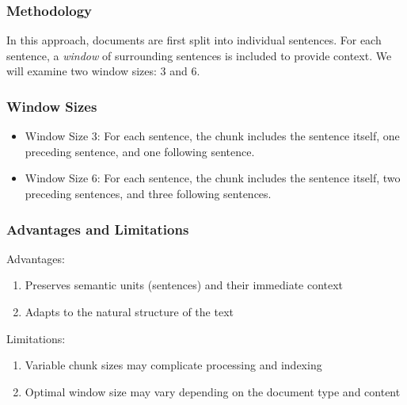 \subsubsection{Methodology}
In this approach, documents are first split into individual sentences.
For each sentence, a \textit{window} of surrounding sentences is included to provide context.
We will examine two window sizes: 3 and 6.
\subsubsection{Window Sizes}
\begin{itemize}
    \item Window Size 3: For each sentence, the chunk includes the sentence itself, one preceding sentence, and one following sentence.
    \item Window Size 6: For each sentence, the chunk includes the sentence itself, two preceding sentences, and three following sentences.
\end{itemize}
\subsubsection{Advantages and Limitations}
Advantages:
\begin{enumerate}
    \item Preserves semantic units (sentences) and their immediate context
    \item Adapts to the natural structure of the text
\end{enumerate}
Limitations:
\begin{enumerate}
    \item Variable chunk sizes may complicate processing and indexing
    \item Optimal window size may vary depending on the document type and content
\end{enumerate}
